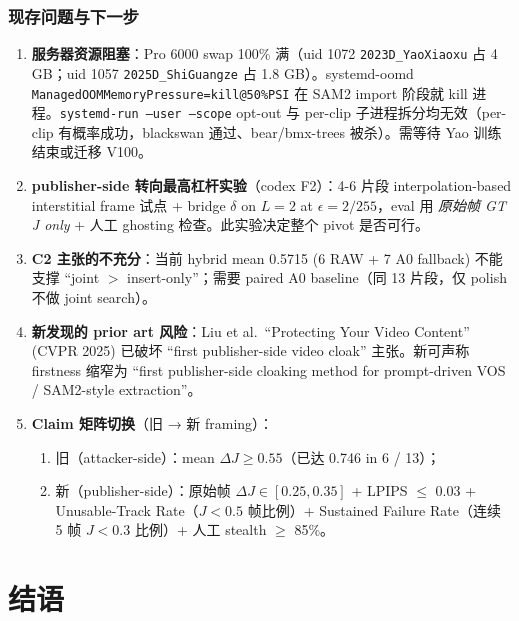 \documentclass[11pt,a4paper]{ctexart}
\begin{document}
\subsubsection*{现存问题与下一步}

\begin{enumerate}[leftmargin=2em]
    \item \textbf{服务器资源阻塞}：Pro 6000 swap 100\% 满（uid 1072 \texttt{2023D\_YaoXiaoxu} 占 4 GB；uid 1057 \texttt{2025D\_ShiGuangze} 占 1.8 GB）。systemd-oomd \texttt{ManagedOOMMemoryPressure=kill@50\%PSI} 在 SAM2 import 阶段就 kill 进程。\texttt{systemd-run --user --scope} opt-out 与 per-clip 子进程拆分均无效（per-clip 有概率成功，blackswan 通过、bear/bmx-trees 被杀）。需等待 Yao 训练结束或迁移 V100。
    \item \textbf{publisher-side 转向最高杠杆实验}（codex F2）：4-6 片段 interpolation-based interstitial frame 试点 + bridge $\delta$ on $L{=}2$ at $\epsilon{=}2/255$，eval 用 \emph{原始帧 GT J only} + 人工 ghosting 检查。此实验决定整个 pivot 是否可行。
    \item \textbf{C2 主张的不充分}：当前 hybrid mean 0.5715 (6 RAW + 7 A0 fallback) 不能支撑 ``joint $>$ insert-only''；需要 paired A0 baseline（同 13 片段，仅 polish 不做 joint search）。
    \item \textbf{新发现的 prior art 风险}：Liu et al.\ ``Protecting Your Video Content'' (CVPR 2025) 已破坏 ``first publisher-side video cloak'' 主张。新可声称 firstness 缩窄为 ``first publisher-side cloaking method for prompt-driven VOS / SAM2-style extraction''。
    \item \textbf{Claim 矩阵切换}（旧 → 新 framing）：
        \begin{enumerate}[leftmargin=1.5em]
            \item 旧（attacker-side）：mean $\Delta J \geq 0.55$（已达 0.746 in 6 / 13）；
            \item 新（publisher-side）：原始帧 $\Delta J \in [0.25, 0.35]$ + LPIPS $\leq$ 0.03 + Unusable-Track Rate（$J<0.5$ 帧比例）+ Sustained Failure Rate（连续 5 帧 $J<0.3$ 比例）+ 人工 stealth $\geq$ 85\%。
        \end{enumerate}
\end{enumerate}

\section{结语}
\end{document}
